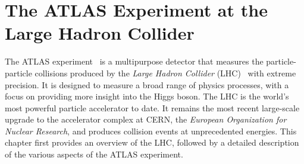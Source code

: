 
\chapter{The ATLAS Experiment at the Large Hadron Collider}
\label{chap:experiment}
The ATLAS experiment~\cite{PERF-2007-01} is a multipurpose detector that measures the particle-particle collisions produced by the \emph{Large Hadron Collider} (LHC)~\cite{Evans:2008zzb} with extreme precision. It is designed to measure a broad range of physics processes, with a focus on providing more insight into the Higgs boson.
The LHC is the world's most powerful particle accelerator to date. It remains the most recent large-scale upgrade to the accelerator complex at CERN, the \emph{European Organization for Nuclear Research}, and produces collision events at unprecedented energies.
This chapter first provides an overview of the LHC, followed by a detailed description of the various aspects of the ATLAS experiment.

